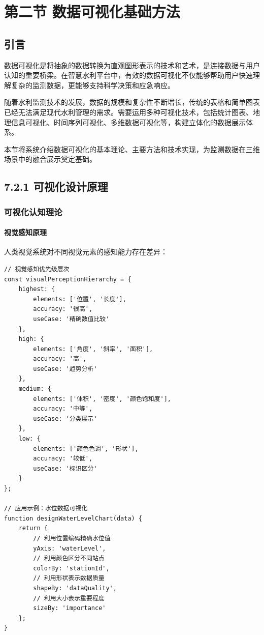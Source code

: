 \section{第二节
数据可视化基础方法}\label{ux7b2cux4e8cux8282-ux6570ux636eux53efux89c6ux5316ux57faux7840ux65b9ux6cd5}

\subsection{引言}\label{ux5f15ux8a00}

数据可视化是将抽象的数据转换为直观图形表示的技术和艺术，是连接数据与用户认知的重要桥梁。在智慧水利平台中，有效的数据可视化不仅能够帮助用户快速理解复杂的监测数据，更能够支持科学决策和应急响应。

随着水利监测技术的发展，数据的规模和复杂性不断增长，传统的表格和简单图表已经无法满足现代水利管理的需求。需要运用多种可视化技术，包括统计图表、地理信息可视化、时间序列可视化、多维数据可视化等，构建立体化的数据展示体系。

本节将系统介绍数据可视化的基本理论、主要方法和技术实现，为监测数据在三维场景中的融合展示奠定基础。

\subsection{7.2.1
可视化设计原理}\label{ux53efux89c6ux5316ux8bbeux8ba1ux539fux7406}

\subsubsection{可视化认知理论}\label{ux53efux89c6ux5316ux8ba4ux77e5ux7406ux8bba}

\paragraph{视觉感知原理}\label{ux89c6ux89c9ux611fux77e5ux539fux7406}

人类视觉系统对不同视觉元素的感知能力存在差异：

\begin{lstlisting}
// 视觉感知优先级层次
const visualPerceptionHierarchy = {
    highest: {
        elements: ['位置', '长度'],
        accuracy: '很高',
        useCase: '精确数值比较'
    },
    high: {
        elements: ['角度', '斜率', '面积'],
        accuracy: '高',
        useCase: '趋势分析'
    },
    medium: {
        elements: ['体积', '密度', '颜色饱和度'],
        accuracy: '中等',
        useCase: '分类展示'
    },
    low: {
        elements: ['颜色色调', '形状'],
        accuracy: '较低',
        useCase: '标识区分'
    }
};

// 应用示例：水位数据可视化
function designWaterLevelChart(data) {
    return {
        // 利用位置编码精确水位值
        yAxis: 'waterLevel',
        // 利用颜色区分不同站点
        colorBy: 'stationId',
        // 利用形状表示数据质量
        shapeBy: 'dataQuality',
        // 利用大小表示重要程度
        sizeBy: 'importance'
    };
}
\end{lstlisting}

